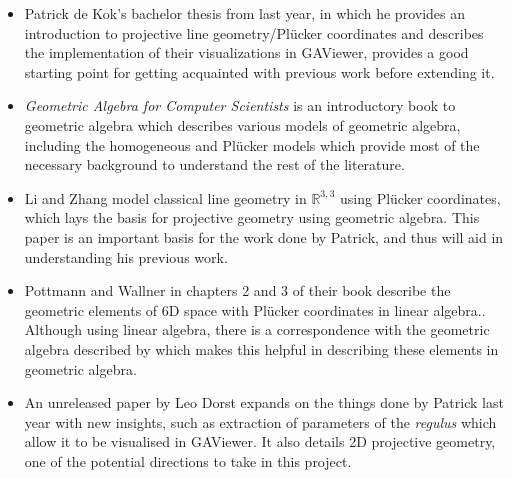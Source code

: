 \documentclass[a4paper, 10pt]{article}
\begin{document}
\begin{itemize}
  \item Patrick de Kok's bachelor thesis from last year\cite{dekok2012}, in which
    he provides an introduction to projective line geometry/Pl\"{u}cker
    coordinates and describes the implementation of their visualizations in
    GAViewer, provides a good starting point for getting acquainted with
    previous work before extending it.
  \item \emph{Geometric Algebra for Computer
    Scientists}\cite{dorst2009geometric} is an introductory book to geometric
    algebra which describes various models of geometric algebra, including the
    homogeneous and Pl\"{u}cker models which provide most of the necessary
    background to understand the rest of the literature.
  \item Li and Zhang\cite{hangbo2011} model classical line geometry in
    $\mathbb{R}^{3,3}$ using Pl\"{u}cker coordinates, which lays the basis
    for projective geometry using geometric algebra. This paper is an important
    basis for the work done by Patrick, and thus will aid in understanding his
    previous work.
  \item Pottmann and Wallner\cite{pottmann2001computational} in chapters 2 and 3
    of their book describe the geometric elements of 6D space with Pl\"{u}cker
    coordinates in linear algebra.. Although using linear algebra, there is a
    correspondence with the geometric algebra described by \cite{hangbo2011}
    which makes this helpful in describing these elements in geometric
    algebra.
  \item An unreleased paper by Leo Dorst\cite{dorst2013versors} expands on the
    things done by Patrick last year with new insights, such as extraction of
    parameters of the \emph{regulus} which allow it to be visualised in
    GAViewer. It also details 2D projective geometry, one of the potential
    directions to take in this project.
\end{itemize}



\end{document}
